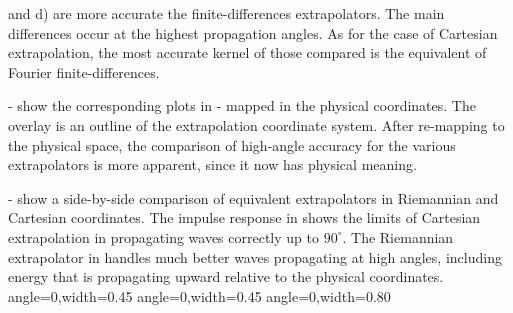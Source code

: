 and d) are more accurate the finite-differences extrapolators. The
main differences occur at the highest propagation angles. As for the
case of Cartesian extrapolation, the most accurate kernel of those
compared is the equivalent of Fourier finite-differences.
\par
{}- show the corresponding plots 
in - mapped in the physical
coordinates. The overlay is an outline of the extrapolation coordinate
system. After re-mapping to the physical space, the comparison of
high-angle accuracy for the various extrapolators is more apparent,
since it now has physical meaning.
\par
{}- show a side-by-side comparison of 
equivalent extrapolators in Riemannian and Cartesian coordinates. The
impulse response in  shows the limits of Cartesian
extrapolation in propagating waves correctly up to $90^\circ$. The
Riemannian extrapolator in  handles much better waves
propagating at high angles, including energy that is propagating
upward relative to the physical coordinates.
{angle=0,width=0.45\textwidth}{\RWElabel}
{angle=0,width=0.45\textwidth}{\CARlabel}
{angle=0,width=0.80\textwidth}{\COMPlabel}


